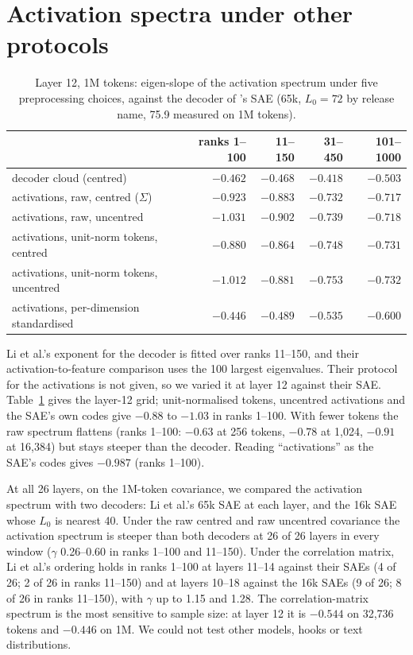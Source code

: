 \documentclass[10pt,twocolumn]{article}
\newcommand{\Sig}{\Sigma}
\newcommand{\Lz}{L_0}
\begin{document}
\section{Activation spectra under other protocols}
\label{app:li}

\begin{table}[!htb]
\centering
\caption{Layer 12, 1M tokens: eigen-slope of the activation spectrum under five preprocessing choices, against the decoder of \citeauthor{li2025geometry}'s SAE (65k, $\Lz=72$ by release name, 75.9 measured on 1M tokens).}
\label{tab:li}
\small
\begin{tabular}{l rrrr}
\toprule
 & ranks 1--100 & 11--150 & 31--450 & 101--1000 \\
\midrule
decoder cloud (centred) & $-0.462$ & $-0.468$ & $-0.418$ & $-0.503$ \\
activations, raw, centred ($\Sig$) & $-0.923$ & $-0.883$ & $-0.732$ & $-0.717$ \\
activations, raw, uncentred & $-1.031$ & $-0.902$ & $-0.739$ & $-0.718$ \\
activations, unit-norm tokens, centred & $-0.880$ & $-0.864$ & $-0.748$ & $-0.731$ \\
activations, unit-norm tokens, uncentred & $-1.012$ & $-0.881$ & $-0.753$ & $-0.732$ \\
activations, per-dimension standardised & $-0.446$ & $-0.489$ & $-0.535$ & $-0.600$ \\
\bottomrule
\end{tabular}
\end{table}

Li et al.'s exponent for the decoder is fitted over ranks 11--150, and their activation-to-feature comparison uses the 100 largest eigenvalues. Their protocol for the activations is not given, so we varied it at layer 12 against their SAE. Table~\ref{tab:li} gives the layer-12 grid; unit-normalised tokens, uncentred activations and the SAE's own codes give $-0.88$ to $-1.03$ in ranks 1--100. With fewer tokens the raw spectrum flattens (ranks 1--100: $-0.63$ at 256 tokens, $-0.78$ at 1,024, $-0.91$ at 16,384) but stays steeper than the decoder. Reading ``activations'' as the SAE's codes gives $-0.987$ (ranks 1--100).

At all 26 layers, on the 1M-token covariance, we compared the activation spectrum with two decoders: Li et al.'s 65k SAE at each layer, and the 16k SAE whose $\Lz$ is nearest 40. Under the raw centred and raw uncentred covariance the activation spectrum is steeper than both decoders at 26 of 26 layers in every window ($\gamma$ 0.26--0.60 in ranks 1--100 and 11--150). Under the correlation matrix, Li et al.'s ordering holds in ranks 1--100 at layers 11--14 against their SAEs (4 of 26; 2 of 26 in ranks 11--150) and at layers 10--18 against the 16k SAEs (9 of 26; 8 of 26 in ranks 11--150), with $\gamma$ up to 1.15 and 1.28. The correlation-matrix spectrum is the most sensitive to sample size: at layer 12 it is $-0.544$ on 32,736 tokens and $-0.446$ on 1M. We could not test other models, hooks or text distributions.
\end{document}

